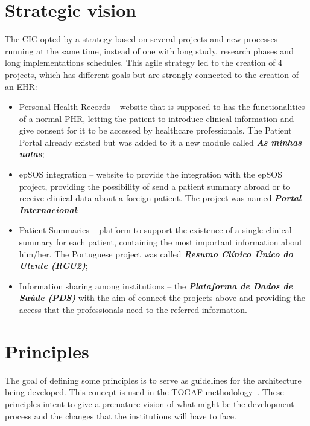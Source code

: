 \section{Strategic vision}

The CIC opted by a strategy based on several projects and new processes running at the same time, instead of one with long study, research phases and long implementations schedules. This agile strategy led to the creation of 4 projects, which has different goals but are strongly connected to the creation of an EHR:

\begin{itemize}
\item Personal Health Records -- website that is supposed to has the functionalities of a normal PHR, letting the patient to introduce clinical information and give consent for it to be accessed by healthcare professionals. The Patient Portal already existed but was added to it a new module called \textit{\textbf{As minhas notas}}; 
\item epSOS integration -- website to provide the integration with the epSOS project, providing the possibility of send a patient summary abroad or to receive clinical data about a foreign patient. The project was named \textit{\textbf{Portal Internacional}};
\item Patient Summaries -- platform to support the existence of a single clinical summary for each patient, containing the most important information about him/her. The Portuguese project was called \textbf{\textit{Resumo Clínico Único do Utente (RCU2)}};
\item Information sharing among institutions -- the \textbf{\textit{Plataforma de Dados de Saúde (PDS)}} with the aim of connect the projects above and providing the access that the professionals need to the referred information.
\end{itemize}



\section{Principles}

The goal of defining some principles is to serve as guidelines for the architecture being developed. This concept is used in the TOGAF methodology~\citep{Josey2009, Josey2011}. These principles intent to give a premature vision of what might be the development process and the changes that the institutions will have to face.

